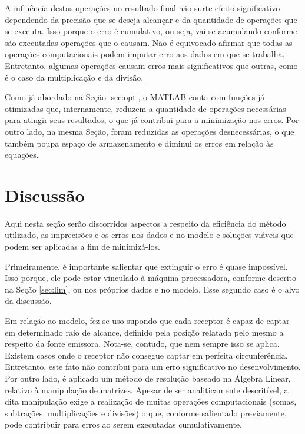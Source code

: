 	A influência destas operações no resultado final não surte efeito significativo dependendo da precisão que se deseja
	alcançar e da quantidade de operações que se executa. Isso porque o erro é cumulativo, ou seja, vai se acumulando conforme
	são executadas operações que o causam. Não é equivocado afirmar que todas as operações computacionais podem imputar erro
	aos dados em que se trabalha. Entretanto, algumas operações causam erros mais significativos que outras, como é o caso da
	multiplicação e da divisão.

	Como já abordado na Seção \ref{sec:opt}, o MATLAB conta com funções já otimizadas que, internamente, reduzem a quantidade de operações
	necessárias para atingir seus resultados, o que já contribui para a minimização nos erros. Por outro lado, na mesma Seção, foram
	reduzidas as operações desnecessárias, o que também poupa espaço de armazenamento e diminui os erros em relação às equações.

	\section{Discussão}
	\label{sec:discussao}
	Aqui nesta seção serão discorridos aspectos a respeito da eficiência do método utilizado, as imprecisões e os erros
	nos dados e no modelo e soluções viáveis que podem ser aplicadas a fim de minimizá-los.

	Primeiramente, é importante salientar que extinguir o erro é quase impossível. Isso porque, ele pode estar vinculado
	à máquina processadora, conforme descrito na Seção \ref{sec:lim}, ou nos próprios dados e no modelo. Esse segundo caso é o alvo
	da discussão.

	Em relação ao modelo, fez-se uso supondo que cada receptor é capaz de captar em determinado raio de alcance, definido pela
	posição relatada pelo mesmo a respeito da fonte emissora. Nota-se, contudo, que nem sempre isso se aplica. Existem casos
	onde o receptor não consegue captar em perfeita circunferência. Entretanto, este fato não contribui para um erro significativo
	no desenvolvimento. Por outro lado, é aplicado um método de resolução baseado na Álgebra Linear, relativo à manipulação de matrizes. Apesar
	de ser analiticamente descritível, a dita manipulação exige a realização de muitas operações computacionais (somas, subtrações,
	multiplicações e divisões) o que, conforme salientado previamente, pode contribuir para erros ao serem executadas cumulativamente.

